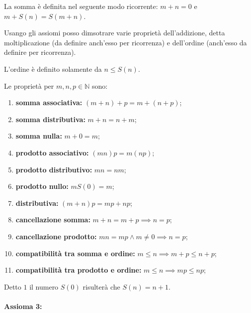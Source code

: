 \documentclass[a4paper]{article}
\begin{document}
La somma è definita nel seguente modo ricorrente: \(m+n=0\) e \(m+S(n) = S(m+n)\).

Usango gli assiomi posso dimsotrare varie proprietà dell'addizione, detta moltiplicazione
(da definire anch'esso per ricorrenza) e dell'ordine (anch'esso da definire per ricorrenza).

L'ordine è definito solamente da \(n \leq S(n)\).

Le proprietà per \(m,n,p\in\mathbb{N}\) sono:
\begin{enumerate}
    \item \textbf{somma associativa:} \((m+n)+p = m + (n+p)\);
    \item \textbf{somma distributiva:} \(m + n = n + m\);
    \item \textbf{somma nulla:} \(m + 0 = m\);
    \item \textbf{prodotto associativo:} \((mn)p = m(np)\);
    \item \textbf{prodotto distributivo:} \(mn = nm\);
    \item \textbf{prodotto nullo:} \(m S(0)= m\);
    \item \textbf{distributiva:} \((m+n)p = mp + np\);
    \item \textbf{cancellazione somma:} \(m+n = m+p \implies n=p\);
    \item \textbf{cancellazione prodotto:} \(mn = mp \land m \neq 0 \implies n=p\);
    \item \textbf{compatibilità tra somma e ordine:} \(m\leq n \implies m+p \leq n + p\);
    \item \textbf{compatibilità tra prodotto e ordine:} \(m\leq n \implies mp \leq np\);
\end{enumerate}

Detto \(1\) il numero \(S(0)\) risulterà che \(S(n) = n+1\).

\paragraph{Assioma 3:}

\end{document}
